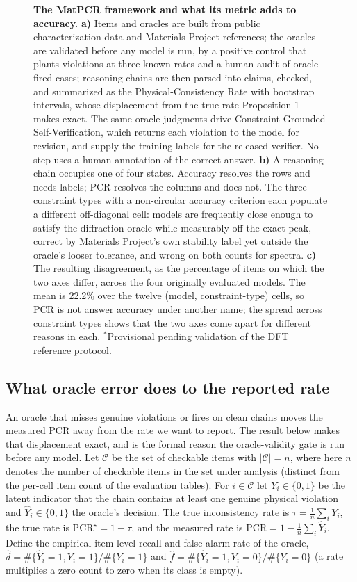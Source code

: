 \documentclass[pdflatex,sn-nature]{sn-jnl}
\begin{document}
\begin{figure}[p]
\caption{\justifying\textbf{The MatPCR framework and what its metric adds to accuracy.} \textbf{a)} Items and oracles are built from public characterization data and Materials Project references; the oracles are validated before any model is run, by a positive control that plants violations at three known rates and a human audit of oracle-fired cases; reasoning chains are then parsed into claims, checked, and summarized as the Physical-Consistency Rate with bootstrap intervals, whose displacement from the true rate Proposition 1 makes exact. The same oracle judgments drive Constraint-Grounded Self-Verification, which returns each violation to the model for revision, and supply the training labels for the released verifier. No step uses a human annotation of the correct answer. \textbf{b)} A reasoning chain occupies one of four states. Accuracy resolves the rows and needs labels; PCR resolves the columns and does not. The three constraint types with a non-circular accuracy criterion each populate a different off-diagonal cell: models are frequently close enough to satisfy the diffraction oracle while measurably off the exact peak, correct by Materials Project's own stability label yet outside the oracle's looser tolerance, and wrong on both counts for spectra. \textbf{c)} The resulting disagreement, as the percentage of items on which the two axes differ, across the four originally evaluated models. The mean is 22.2\% over the twelve (model, constraint-type) cells, so PCR is not answer accuracy under another name; the spread across constraint types shows that the two axes come apart for different reasons in each. $^{*}$Provisional pending validation of the DFT reference protocol.}
\label{fig:pipeline}
\end{figure}

\subsection*{What oracle error does to the reported rate}
An oracle that misses genuine violations or fires on clean chains moves the measured PCR away
from the rate we want to report. The result below makes that displacement exact, and is the
formal reason the oracle-validity gate is run before any model. Let
$\mathcal{C}$ be the set of checkable items with $|\mathcal{C}|=n$, where here $n$ denotes
the number of checkable items in the set under analysis (distinct from the per-cell item
count of the evaluation tables). For
$i\in\mathcal{C}$ let $Y_i\in\{0,1\}$ be the latent indicator that the chain contains
at least one genuine physical violation and $\hat Y_i\in\{0,1\}$ the oracle's decision.
The true inconsistency rate is $\tau=\frac1n\sum_i Y_i$, the true rate is
$\mathrm{PCR}^\star=1-\tau$, and the measured rate is
$\mathrm{PCR}=1-\frac1n\sum_i\hat Y_i$. Define the empirical item-level recall and
false-alarm rate of the oracle,
$\hat d=\#\{\hat Y_i{=}1,Y_i{=}1\}/\#\{Y_i{=}1\}$ and
$\hat f=\#\{\hat Y_i{=}1,Y_i{=}0\}/\#\{Y_i{=}0\}$ (a rate multiplies a zero
count to zero when its class is empty).
\end{document}
